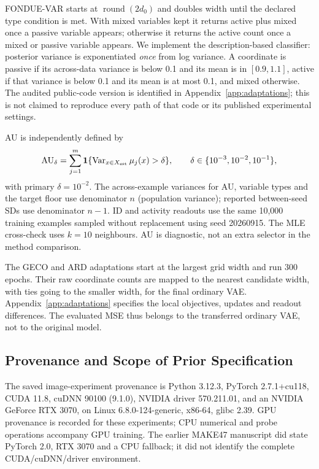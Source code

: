 FONDUE-VAR starts at $\operatorname{round}(2d_0)$ and doubles width until
the declared type condition is met. With mixed variables kept it returns
active plus mixed once a passive variable appears; otherwise it returns
the active count once a mixed or passive variable appears. We implement
the description-based classifier: posterior variance is exponentiated
\emph{once} from log variance. A coordinate is passive if its across-data
variance is below 0.1 and its mean is in $[0.9,1.1]$, active if that
variance is below 0.1 and its mean is at most 0.1, and mixed otherwise.
The audited public-code version is identified in
Appendix~\ref{app:adaptations}; this is not claimed to reproduce every
path of that code or its published experimental settings.

AU is independently defined by
\begin{equation}
 \mathrm{AU}_\delta=\sum_{j=1}^{m}
 \mathbf1\{\operatorname{Var}_{x\in X_{\rm est}}\mu_j(x)>\delta\},
 \qquad \delta\in\{10^{-3},10^{-2},10^{-1}\},
 \label{eq:au}
\end{equation}
with primary $\delta=10^{-2}$. The across-example variances for AU,
variable types and the target floor use denominator $n$ (population
variance); reported between-seed SDs use denominator $n-1$.
ID and activity readouts use the same
10,000 training examples sampled without replacement using seed
20260915. The MLE cross-check uses $k=10$ neighbours. AU is diagnostic,
not an extra selector in the method comparison.

The GECO and ARD adaptations start at the largest grid width and run
300 epochs. Their raw coordinate counts are mapped to the nearest
candidate width, with ties going to the smaller width, for the final
ordinary VAE. Appendix~\ref{app:adaptations} specifies the local
objectives, updates and readout differences. The evaluated MSE thus
belongs to the transferred ordinary VAE, not to the original model.

\subsection{Provenance and Scope of Prior Specification}\label{sec:provenance}
The saved image-experiment provenance is Python 3.12.3, PyTorch
2.7.1+cu118, CUDA 11.8, cuDNN 90100 (9.1.0), NVIDIA driver 570.211.01,
and an NVIDIA GeForce RTX 3070, on Linux 6.8.0-124-generic, x86-64,
glibc 2.39. GPU provenance is recorded for these experiments; CPU
numerical and probe operations accompany GPU training. The earlier
MAKE47 manuscript did state PyTorch 2.0, RTX 3070 and a CPU fallback;
it did not identify the complete CUDA/cuDNN/driver environment.

